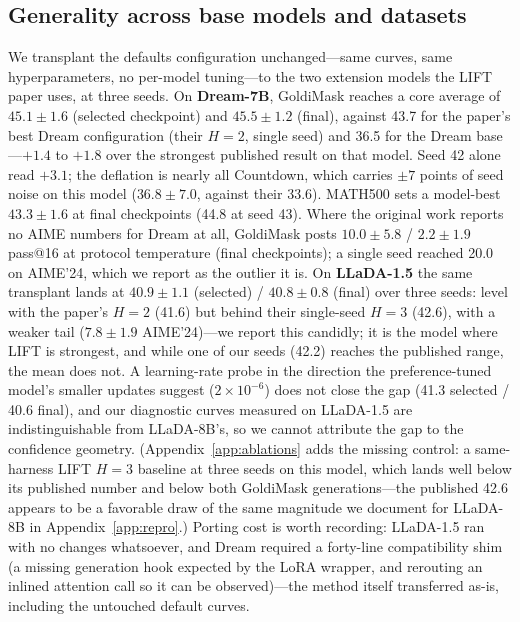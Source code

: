 \documentclass{article} %
\begin{document}
\subsection{Generality across base models and datasets}
\label{sec:generality}

We transplant the defaults configuration unchanged---same curves, same hyperparameters, no per-model tuning---to the two extension models the LIFT paper uses, at three seeds. On \textbf{Dream-7B}, GoldiMask reaches a core average of $45.1 \pm 1.6$ (selected checkpoint) and $45.5 \pm 1.2$ (final), against 43.7 for the paper's best Dream configuration (their $H{=}2$, single seed) and 36.5 for the Dream base---$+1.4$ to $+1.8$ over the strongest published result on that model. Seed 42 alone read $+3.1$; the deflation is nearly all Countdown, which carries $\pm 7$ points of seed noise on this model ($36.8 \pm 7.0$, against their 33.6). MATH500 sets a model-best $43.3 \pm 1.6$ at final checkpoints (44.8 at seed 43). Where the original work reports no AIME numbers for Dream at all, GoldiMask posts $10.0 \pm 5.8$ / $2.2 \pm 1.9$ pass@16 at protocol temperature (final checkpoints); a single seed reached 20.0 on AIME'24, which we report as the outlier it is. On \textbf{LLaDA-1.5} the same transplant lands at $40.9 \pm 1.1$ (selected) / $40.8 \pm 0.8$ (final) over three seeds: level with the paper's $H{=}2$ (41.6) but behind their single-seed $H{=}3$ (42.6), with a weaker tail ($7.8 \pm 1.9$ AIME'24)---we report this candidly; it is the model where LIFT is strongest, and while one of our seeds (42.2) reaches the published range, the mean does not. A learning-rate probe in the direction the preference-tuned model's smaller updates suggest ($2 \times 10^{-6}$) does not close the gap (41.3 selected / 40.6 final), and our diagnostic curves measured on LLaDA-1.5 are indistinguishable from LLaDA-8B's, so we cannot attribute the gap to the confidence geometry. (Appendix~\ref{app:ablations} adds the missing control: a same-harness LIFT $H{=}3$ baseline at three seeds on this model, which lands well below its published number and below both GoldiMask generations---the published 42.6 appears to be a favorable draw of the same magnitude we document for LLaDA-8B in Appendix~\ref{app:repro}.) Porting cost is worth recording: LLaDA-1.5 ran with no changes whatsoever, and Dream required a forty-line compatibility shim (a missing generation hook expected by the LoRA wrapper, and rerouting an inlined attention call so it can be observed)---the method itself transferred as-is, including the untouched default curves.
\end{document}
